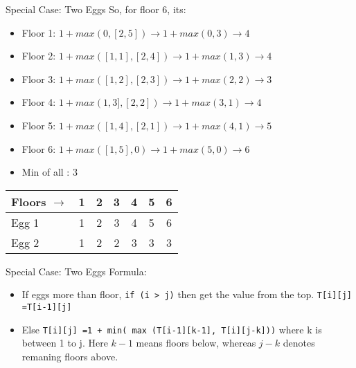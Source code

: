    \begin{frame}[fragile]{Special Case: Two Eggs}
So, for floor 6, its:
\begin{itemize}
\item Floor 1:  $1 + max (0,[2,5]) \rightarrow 1 + max (0,3) \rightarrow 4$
\item Floor 2:  $1 + max ([1,1],[2,4]) \rightarrow 1 + max (1,3) \rightarrow 4$
\item Floor 3:  $1 + max ([1,2],[2,3]) \rightarrow 1 + max (2,2) \rightarrow 3$
\item Floor 4:  $1 + max (1,3],[2,2]) \rightarrow 1 + max (3,1) \rightarrow 4$
\item Floor 5:  $1 + max ([1,4],[2,1]) \rightarrow 1 + max (4,1) \rightarrow 5$
\item Floor 6:  $1 + max ([1,5],0) \rightarrow 1 + max (5,0) \rightarrow 6$
\item Min of all : 3
\end{itemize}
 \begin{center}
 \begin{tabular}{|l|c|c|c|c|c|c|}
 \hline
Floors $\rightarrow$ & 1 &  2 &   3 &   4 & 5 &  6\\  \hline
Egg 1 & 1 & 2 & 3 & 4 & 5 & 6\\
Egg 2 & 1 & 2 & 2 & 3 & 3 & 3\\
 \hline
 \end{tabular}
 \end{center}
\end{frame}

   \begin{frame}[fragile]{Special Case: Two Eggs}
Formula:
\begin{itemize}
\item If eggs more than floor, \lstinline|if (i > j)| then get the value from the top. \lstinline|T[i][j] =T[i-1][j]|
\item Else \lstinline|T[i][j] =1 + min( max (T[i-1][k-1], T[i][j-k]))| where k is between 1 to j. Here $k-1$ means floors below, whereas $j-k$ denotes remaning floors above.
\end{itemize}

\end{frame}


